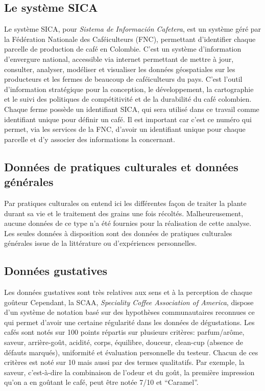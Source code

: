 \subsection{Le système SICA}Le système SICA, pour \textit{Sistema de Información Cafetera}, est un système géré par la Fédération Nationale des Caféiculteurs (FNC), permettant d'identifier chaque parcelle de production de café en Colombie. C'est un système d'information d'envergure national, accessible via internet permettant de mettre à jour, consulter, analyser, modéliser et visualiser les données géospatiales sur les producteurs et les fermes de beaucoup de caféiculteurs du pays. C'est l'outil d'information stratégique pour la conception, le développement, la cartographie et le suivi des politiques de compétitivité et de la durabilité du café colombien\cite{SICA}. Chaque ferme possède un identifiant SICA, qui sera utilisé dans ce travail comme identifiant unique pour définir un café. Il est important car c'est ce numéro qui permet, via les services de la FNC, d'avoir un identifiant unique pour chaque parcelle et d'y associer des informations la concernant.  

\subsection{Données de pratiques culturales et données générales}
Par pratiques culturales on entend ici les différentes façon de traiter la plante durant sa vie et le traitement des grains une fois récoltés. Malheureusement, aucune données de ce type n'a été fournies pour la réalisation de cette analyse. Les seules données à disposition sont des données de pratiques culturales générales issue de la littérature ou d'expériences personnelles. \cite{CoffeeImport} \cite{CCI} \cite{WikiCafeicultureColombie} \cite{InternationalCoffeeOrganisation} \cite{GuideCafe}

\subsection{Données gustatives}
Les données gustatives sont très relatives aux sens et à la perception de chaque goûteur Cependant, la SCAA, \textit{Speciality Coffee Association of America}, dispose d’un système de notation \cite{CupingProtocol} basé sur des hypothèses communautaires reconnues ce qui permet d’avoir une certaine régularité dans les données de dégustations. Les cafés sont notés sur 100 points répartis sur plusieurs critères: parfum/arôme, saveur, arrière-goût, acidité, corps, équilibre, douceur, clean-cup (absence de défauts marqués), uniformité et évaluation personnelle du testeur.  Chacun de ces critères est noté sur 10 mais aussi par des termes qualitatifs. Par exemple, la saveur, c’est-à-dire la combinaison de l’odeur et du goût, la première impression qu’on a en goûtant le café, peut être notée 7/10 et “Caramel”. \\

